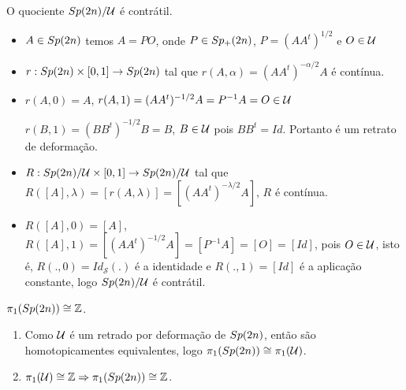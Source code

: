 \documentclass{beamer}
\begin{document}
	\begin{frame}
		
		\begin{teorema}
			O quociente $Sp(2n)/\mathcal{U}$ é contrátil.
		\end{teorema}
		\begin{prova}
			
			\begin{itemize}
				\item $A \in Sp(2n)$ temos $A=PO$, onde $P \in Sp_{+}(2n)$, $P=(AA^{t})^{1/2}$ e $O \in \mathcal{U}$
				
				\pause
				\item $r:Sp(2n)\times [0,1] \to Sp(2n)$ tal que $r(A, \alpha) = (AA^{t})^{-\alpha/2}A$ é contínua. 
				
				\pause
				\item $r(A, 0) = A$, $r(A, 1) = (AA^{t})^{-1/2}A = P^{-1}A = O \in \mathcal{U}$
				
				$r(B, 1) = (BB^{t})^{-1/2}B = B$, $B \in \mathcal{U}$ pois $BB^{t} = Id$. Portanto é um retrato de deformação.
				
				\pause
				\item $R:Sp(2n)/\mathcal{U} \times [0,1] \to Sp(2n)/\mathcal{U}$ tal que $R([A], \lambda) = [r(A, \lambda)] = [(AA^{t})^{-\lambda/2}A]$, $R$ é contínua.
				
				\pause
				\item $R([A], 0) = [A]$, $R([A], 1) = [(AA^{t})^{-1/2}A] = [P^{-1}A] = [O] = [Id]$, pois $O \in \mathcal{U}$, isto é, $R(., 0) = Id_{\mathcal{S}}(.)$ é a identidade e $R(., 1) = [Id]$ é a aplicação constante, logo $Sp(2n)/\mathcal{U} $ é contrátil.
		\end{itemize}
		\end{prova}
	\end{frame}
	
	\begin{frame}
		
		\begin{teorema}
			$\pi_{1}(Sp(2n)) \cong \mathbb{Z}$.
		\end{teorema}
		\begin{prova}
			\begin{enumerate}
				\item Como $\mathcal{U}$ é um retrado por deformação de $Sp(2n)$, então são homotopicamentes equivalentes, logo $\pi_{1}(Sp(2n)) \cong \pi_{1}(\mathcal{U})$.
				
				\pause
				\item $\pi_{1}(\mathcal{U}) \cong \mathbb{Z} \Rightarrow \pi_{1}(Sp(2n)) \cong \mathbb{Z}$.
			\end{enumerate}
		\end{prova}
	\end{frame}
	
\end{document}
